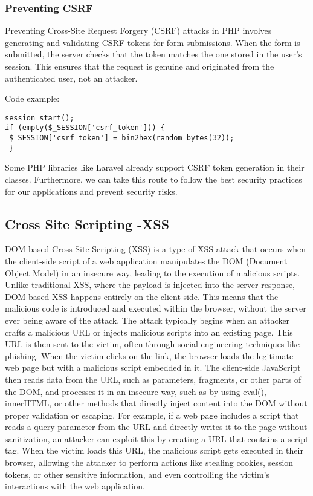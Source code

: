 \subsubsection{Preventing CSRF}
Preventing Cross-Site Request Forgery (CSRF) attacks in PHP involves generating and validating CSRF tokens for form submissions. 
When the form is submitted, the server checks that the token matches the one stored in the user's session. 
This ensures that the request is genuine and originated from the authenticated user, not an attacker.


Code example:
\begin{verbatim}
session_start(); 
if (empty($_SESSION['csrf_token'])) {
 $_SESSION['csrf_token'] = bin2hex(random_bytes(32));
 }
\end{verbatim}


Some PHP libraries like Laravel already support CSRF token generation in their classes. 
Furthermore, we can take this route to follow the best security practices for our applications and prevent security risks. 

\subsection{Cross Site Scripting -XSS}
DOM-based Cross-Site Scripting (XSS) is a type of XSS attack that occurs when the client-side script of a web application manipulates the DOM (Document Object Model) in an insecure way, leading to the execution of malicious scripts. 
Unlike traditional XSS, where the payload is injected into the server response, DOM-based XSS happens entirely on the client side. 
This means that the malicious code is introduced and executed within the browser, without the server ever being aware of the attack.
The attack typically begins when an attacker crafts a malicious URL or injects malicious scripts into an existing page. 
This URL is then sent to the victim, often through social engineering techniques like phishing. 
When the victim clicks on the link, the browser loads the legitimate web page but with a malicious script embedded in it. 
The client-side JavaScript then reads data from the URL, such as parameters, fragments, or other parts of the DOM, and processes it in an insecure way, such as by using eval(), innerHTML, or other methods that directly inject content into the DOM without proper validation or escaping.
For example, if a web page includes a script that reads a query parameter from the URL and directly writes it to the page without sanitization, an attacker can exploit this by creating a URL that contains a script tag. 
When the victim loads this URL, the malicious script gets executed in their browser, allowing the attacker to perform actions like stealing cookies, session tokens, or other sensitive information, and even controlling the victim's interactions with the web application.

